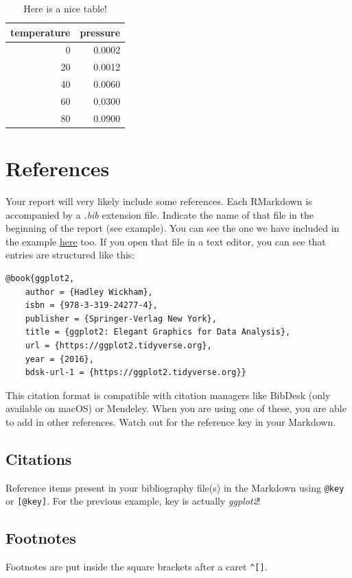\documentclass[
]{book}
\begin{document}
\begin{table}

\caption{\label{tab:nice-tab}Here is a nice table!}
\centering
\begin{tabular}[t]{rr}
\toprule
temperature & pressure\\
\midrule
0 & 0.0002\\
20 & 0.0012\\
40 & 0.0060\\
60 & 0.0300\\
80 & 0.0900\\
\bottomrule
\end{tabular}
\end{table}

\hypertarget{references}{%
\section{References}\label{references}}

Your report will very likely include some references. Each RMarkdown is accompanied by a \emph{.bib} extension file. Indicate the name of that file in the beginning of the report (see example). You can see the one we have included in the example \href{https://github.com/hdsu-bioquant/bioinfo_MoBiMA/tree/main/report_example}{here} too. If you open that file in a text editor, you can see that entries are structured like this:

\begin{verbatim}
@book{ggplot2,
    author = {Hadley Wickham},
    isbn = {978-3-319-24277-4},
    publisher = {Springer-Verlag New York},
    title = {ggplot2: Elegant Graphics for Data Analysis},
    url = {https://ggplot2.tidyverse.org},
    year = {2016},
    bdsk-url-1 = {https://ggplot2.tidyverse.org}}
\end{verbatim}

This citation format is compatible with citation managers like BibDesk (only available on macOS) or Mendeley. When you are using one of these, you are able to add in other references. Watch out for the reference key in your Markdown.

\hypertarget{citations}{%
\subsection{Citations}\label{citations}}

Reference items present in your bibliography file(s) in the Markdown using \texttt{@key} or \texttt{{[}@key{]}}. For the previous example, key is actually \emph{ggplot2}!

\hypertarget{footnotes}{%
\subsection{Footnotes}\label{footnotes}}

Footnotes are put inside the square brackets after a caret \texttt{\^{}{[}{]}}.

  
\end{document}
